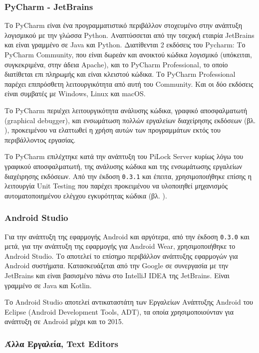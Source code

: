  		\subsubsection{PyCharm - JetBrains}
 			Το PyCharm είναι ένα προγραμματιστικό περιβάλλον στοχευμένο στην ανάπτυξη λογισμικού με την γλώσσα Python. Αναπτύσσεται από την τσεχική εταιρία JetBrains και είναι γραμμένο σε Java και Python. Διατίθενται 2 εκδόσεις του Pycharm: Το PyCharm Community, που είναι δωρεάν και ανοικτού κώδικα λογισμικό (υπόκειται, συγκεκριμένα, στην άδεια Apache), και το PyCharm Professional, το οποίο διατίθεται επι πληρωμής και είναι κλειστού κώδικα. Το PyCharm Professional παρέχει επιπρόσθετη λειτουργικότητα από αυτή του Community. Και οι δύο εκδόσεις είναι συμβατές με Windows, Linux και macOS.

 			Το PyCharm περιέχει λειτουργικότητα ανάλυσης κώδικα, γραφικό αποσφαλματωτή (graphical debugger), και ενσωμάτωση πολλών εργαλείων διαχείρησης εκδόσεων (βλ. ), προκειμένου να ελαττωθεί η χρήση αυτών των προγραμμάτων εκτός του περιβάλλοντος εργασίας.

 			Το PyCharm επιλέχτηκε κατά την ανάπτυξη του PiLock Server κυρίως λόγω του γραφικού αποσφαλματωτή, της ανάλυσης κώδικα και της ενσωμάτωσης εργαλείων διαχέιρησης εκδόσεων. Από την έκδοση \verb|0.3.1| και έπειτα, χρησιμοποιήθηκε επίσης η λειτουργία Unit Testing που παρέχει προκειμένου να υλοποιηθεί μηχανισμός αυτοματοποιημένου ελέγχου εγκυρότητας κώδικα (βλ. ).

 		\subsubsection{Android Studio}
 			Για την ανάπτυξη της εφαρμογής Android και αργότερα, από την έκδοση \verb|0.3.0| και μετά, για την ανάπτυξη της εφαρμογής για Android Wear, χρησιμοποιήθηκε το Android Studio. Το  αποτελεί το επίσημο περιβάλλον ανάπτυξης εφαρμογών για Android συστήματα. Κατασκευάζεται από την Google σε συνεργασία με την JetBrains και είναι βασισμένο πάνω στο IntelliJ IDEA της JetBrains. Είναι γραμμένο σε Java και Kotlin.

 			Το Android Studio αποτελεί αντικαταστάτη των Εργαλείων Ανάπτυξης Android του Eclipse (Android Development Tools, ADT), τα οποία χρησιμοποιούνταν για ανάπτυξη σε Android μέχρι και το 2015.

 		\subsubsection{Άλλα Εργαλεία, Text Editors}
